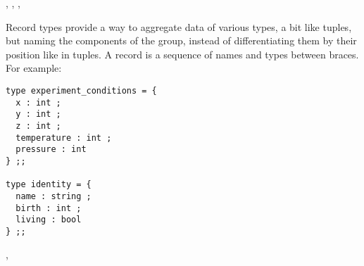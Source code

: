 \bigskip



\vspace{0.2cm}
\begin{syn}
 \is
  \tok{(}  \tok{)}
\sep
{} \is
  \tok{(}  \tok{)}
\sep
{} \is
  \tok{\vertical}  
\sep
{} \is
     \tok{=}
\end{syn}
\vspace{0.2cm}


\vspace{0.5cm}
\label{record-type-definition}

\bigskip

Record types provide a way to aggregate data of various types, a bit like
tuples, but naming the components of the group, instead of
differentiating them by their position like in tuples. A record is
a sequence of names and types between braces. For example:

{\scriptsize
\begin{lstlisting}
type experiment_conditions = {
  x : int ;
  y : int ;
  z : int ;
  temperature : int ;
  pressure : int
} ;;

type identity = {
  name : string ;
  birth : int ;
  living : bool
} ;;
\end{lstlisting}
}

\vspace{0.2cm}
\begin{syn}
 \is
   \tok{=}  \tok{;}
\sep
{} \is
     \tok{=}
  \tok{\{}  \tok{\}}
\end{syn}

